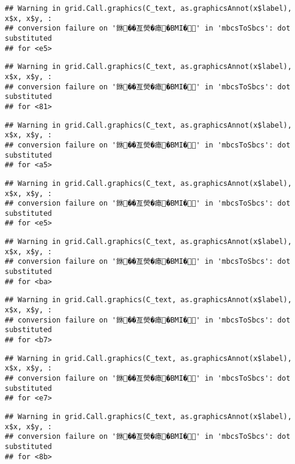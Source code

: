 \documentclass[
]{article}
\begin{document}
\begin{verbatim}
## Warning in grid.Call.graphics(C_text, as.graphicsAnnot(x$label), x$x, x$y, :
## conversion failure on '銝��亙熒�瘜�BMI�' in 'mbcsToSbcs': dot substituted
## for <e5>
\end{verbatim}

\begin{verbatim}
## Warning in grid.Call.graphics(C_text, as.graphicsAnnot(x$label), x$x, x$y, :
## conversion failure on '銝��亙熒�瘜�BMI�' in 'mbcsToSbcs': dot substituted
## for <81>
\end{verbatim}

\begin{verbatim}
## Warning in grid.Call.graphics(C_text, as.graphicsAnnot(x$label), x$x, x$y, :
## conversion failure on '銝��亙熒�瘜�BMI�' in 'mbcsToSbcs': dot substituted
## for <a5>
\end{verbatim}

\begin{verbatim}
## Warning in grid.Call.graphics(C_text, as.graphicsAnnot(x$label), x$x, x$y, :
## conversion failure on '銝��亙熒�瘜�BMI�' in 'mbcsToSbcs': dot substituted
## for <e5>
\end{verbatim}

\begin{verbatim}
## Warning in grid.Call.graphics(C_text, as.graphicsAnnot(x$label), x$x, x$y, :
## conversion failure on '銝��亙熒�瘜�BMI�' in 'mbcsToSbcs': dot substituted
## for <ba>
\end{verbatim}

\begin{verbatim}
## Warning in grid.Call.graphics(C_text, as.graphicsAnnot(x$label), x$x, x$y, :
## conversion failure on '銝��亙熒�瘜�BMI�' in 'mbcsToSbcs': dot substituted
## for <b7>
\end{verbatim}

\begin{verbatim}
## Warning in grid.Call.graphics(C_text, as.graphicsAnnot(x$label), x$x, x$y, :
## conversion failure on '銝��亙熒�瘜�BMI�' in 'mbcsToSbcs': dot substituted
## for <e7>
\end{verbatim}

\begin{verbatim}
## Warning in grid.Call.graphics(C_text, as.graphicsAnnot(x$label), x$x, x$y, :
## conversion failure on '銝��亙熒�瘜�BMI�' in 'mbcsToSbcs': dot substituted
## for <8b>
\end{verbatim}
\end{document}
